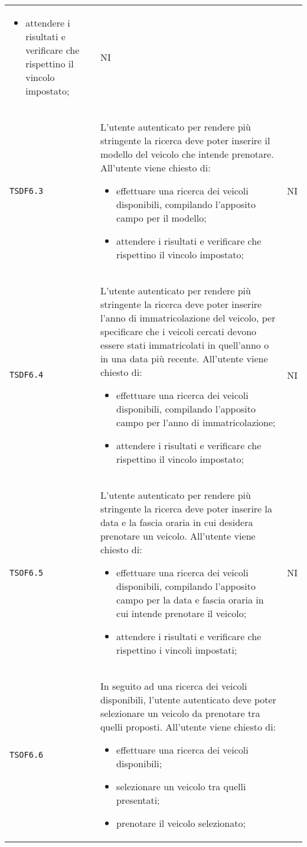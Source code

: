 \begin{longtable}{ >{\centering}p{} >{\centering}p{}
			>{\centering}p{}}
\begin{itemize}
		 	\item attendere i risultati e verificare che rispettino il vincolo impostato;
		 \end{itemize}	&	NI	\tabularnewline
		  \texttt{TSDF6.3}	&	L'utente autenticato per rendere più stringente la ricerca deve poter inserire il modello del veicolo che intende prenotare. All'utente viene chiesto di:
		 \begin{itemize}
		 	\item effettuare una ricerca dei veicoli disponibili, compilando l'apposito campo per il modello;
		 	\item attendere i risultati e verificare che rispettino il vincolo impostato;
		 \end{itemize}	&	NI	\tabularnewline
		  \texttt{TSDF6.4}	&	L'utente autenticato per rendere più stringente la ricerca deve poter inserire l'anno di immatricolazione del veicolo, per specificare che i veicoli cercati devono essere stati immatricolati in quell'anno o in una data più recente. All'utente viene chiesto di:
		 \begin{itemize}
		 	\item effettuare una ricerca dei veicoli disponibili, compilando l'apposito campo per l'anno di immatricolazione;
		 	\item attendere i risultati e verificare che rispettino il vincolo impostato;
		 \end{itemize}	&	NI	\tabularnewline
		 \texttt{TSOF6.5}	&	L'utente autenticato per rendere più stringente la ricerca deve poter inserire la data e la fascia oraria in cui desidera prenotare un veicolo. All'utente viene chiesto di:
		 \begin{itemize}
		 	\item effettuare una ricerca dei veicoli disponibili, compilando l'apposito campo per la data e fascia oraria in cui intende prenotare il veicolo;
		 	\item attendere i risultati e verificare che rispettino i vincoli impostati;
		 \end{itemize}	&	NI	\tabularnewline
		 \texttt{TSOF6.6}	&	In seguito ad una ricerca dei veicoli disponibili, l'utente autenticato deve poter selezionare un veicolo da prenotare tra quelli proposti. All'utente viene chiesto di:
		 \begin{itemize}
		 	\item effettuare una ricerca dei veicoli disponibili;
		 	\item selezionare un veicolo tra quelli presentati;
		 	\item prenotare il veicolo selezionato;

\end{itemize}
\end{longtable}
